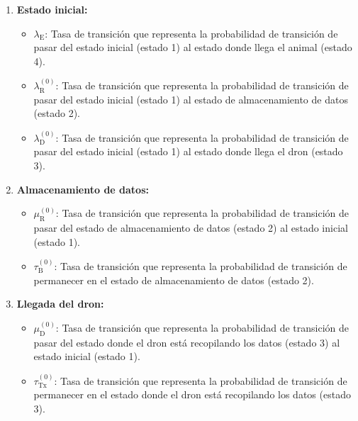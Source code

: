 \begin{enumerate}[label=\arabic*.]
    \item \textbf{Estado inicial:}
    \begin{itemize}
        \item $\lambda_{\text{E}}$: Tasa de transición que representa la probabilidad de transición de pasar del estado inicial (estado 1) al estado donde llega el animal (estado 4).
        \item $\lambda_{\text{R}}^{(0)}$: Tasa de transición que representa la probabilidad de transición de pasar del estado inicial (estado 1) al estado de almacenamiento de datos (estado 2).
        \item $\lambda_{\text{D}}^{(0)}$: Tasa de transición que representa la probabilidad de transición de pasar del estado inicial (estado 1) al estado donde llega el dron (estado 3).
    \end{itemize}
    
    \item \textbf{Almacenamiento de datos:}
    \begin{itemize}
        \item $\mu_{\text{R}}^{(0)}$: Tasa de transición que representa la probabilidad de transición de pasar del estado de almacenamiento de datos (estado 2) al estado inicial (estado 1).
        \item $\tau_{\text{B}}^{(0)}$: Tasa de transición que representa la probabilidad de transición de permanecer en el estado de almacenamiento de datos (estado 2).
    \end{itemize}
    
    \item \textbf{Llegada del dron:}
    \begin{itemize}
        \item $\mu_{\text{D}}^{(0)}$: Tasa de transición que representa la probabilidad de transición de pasar del estado donde el dron está recopilando los datos (estado 3) al estado inicial (estado 1).
        \item $\tau_{\text{Tx}}^{(0)}$: Tasa de transición que representa la probabilidad de transición de permanecer en el estado donde el dron está recopilando los datos (estado 3).
    \end{itemize}
    

\end{enumerate}
